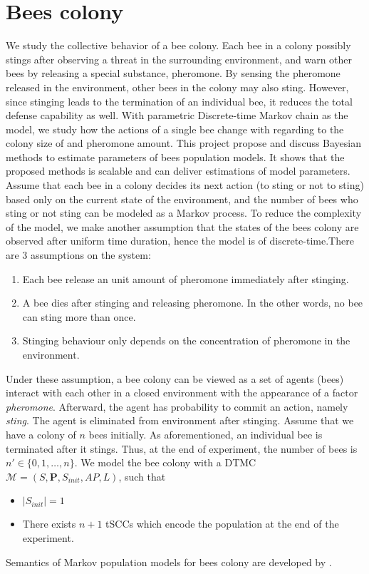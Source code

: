 \section{Bees colony}
We study the collective behavior of a bee colony. Each bee in a colony
possibly stings after observing a threat in the surrounding environment, and
warn other bees by releasing a special substance, pheromone. By sensing the
pheromone released in the environment, other bees in the colony may also
sting. However, since stinging leads to the termination of an individual bee,
it reduces the total defense capability as well. With parametric Discrete-time
Markov chain as the model, we study how the actions of a single bee change
with regarding to the colony size of and pheromone amount. This project
propose and discuss Bayesian methods to estimate parameters of bees population
models. It shows that the proposed methods is scalable and can deliver
estimations of model parameters. Assume that each bee in a colony decides its next action (to sting or not to
sting) based only on the current state of the environment, and the number of
bees who sting or not sting can be modeled as a Markov process. To reduce the
complexity of the model, we make another assumption that the states of the bees
colony are observed after uniform time duration, hence the model is of
discrete-time.There are 3 assumptions on the system:
\begin{enumerate}
    \item Each bee release an unit amount of pheromone immediately after stinging.
    \item A bee dies after stinging and releasing pheromone. In the other words, no
          bee can sting more than once.
    \item Stinging behaviour only depends on the concentration of pheromone in the
          environment.
\end{enumerate}
Under these assumption, a bee colony can be viewed as a set of agents (bees)
interact with each other in a closed environment with the appearance of a factor
\textit{pheromone}. Afterward, the agent has probability to commit an action, namely \textit{sting}.
The agent is eliminated from environment after stinging.
Assume that we have a colony of $n$ bees initially. As aforementioned, an individual bee
is terminated after it stings. Thus, at the end of experiment, the number of
bees is $n'\in\{0,1,\ldots,n\}$. We model the bee colony with a DTMC
$\mathcal{M}=(S,\mathbf{P}, S_{init}, AP,L)$, such that
\begin{itemize}
    \item $|S_{init}|=1$
    \item There exists $n+1$ tSCCs which encode the population at the end of the experiment.
\end{itemize}
Semantics of Markov population models for bees colony are developed by
\cite{hajnal2019data}.
